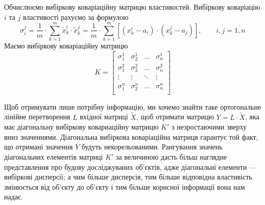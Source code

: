 Обчислюємо вибіркову коваріаційну матрицю властивостей.
Вибіркову коваріацію $i$ та $j$ властивості рахуємо за формулою
\begin{equation*}
  \sigma_i^j
  = \frac{1}{m} \cdot \sum_{k=1}^{m} \tilde{x}_k^i \cdot \tilde{x}_k^j
  = \frac{1}{m} \cdot \sum_{k=1}^{m}
    \left[ \left( x_k^i - a_i \right) \cdot \left( x_k^j - a_j \right) \right],
    \qquad i,j = \overline{1,n}
\end{equation*}
Маємо вибіркову коваріаційну матрицю
\begin{equation*}
  K = \begin{bmatrix}
    \sigma_1^1 & \sigma_2^1 & \dots  & \sigma_n^1 \\
    \sigma_1^2 & \sigma_2^2 & \dots  & \sigma_n^2 \\
    \vdots     & \vdots     & \ddots & \vdots     \\
    \sigma_1^n & \sigma_2^n & \dots  & \sigma_n^n \\
  \end{bmatrix}
\end{equation*}
\begin{comment}
\begin{equation*}
  K =
  \begin{bmatrix}
    \frac{1}{m} \cdot \sum_{k=1}^{m} \tilde{x}_k^1 \cdot \tilde{x}_k^1
    &
    \frac{1}{m} \cdot \sum_{k=1}^{m} \tilde{x}_k^1 \cdot \tilde{x}_k^2
    &
    \dots
    &
    \frac{1}{m} \cdot \sum_{k=1}^{m} \tilde{x}_k^1 \cdot \tilde{x}_k^n
    \\
    \frac{1}{m} \cdot \sum_{k=1}^{m} \tilde{x}_k^2 \cdot \tilde{x}_k^1
    &
    \frac{1}{m} \cdot \sum_{k=1}^{m} \tilde{x}_k^2 \cdot \tilde{x}_k^2
    &
    \dots
    &
    \frac{1}{m} \cdot \sum_{k=1}^{m} \tilde{x}_k^2 \cdot \tilde{x}_k^n
    \\
    \vdots & \vdots & \dots & \vdots \\
    \frac{1}{m} \cdot \sum_{k=1}^{m} \tilde{x}_k^n \cdot \tilde{x}_k^1
    &
    \frac{1}{m} \cdot \sum_{k=1}^{m} \tilde{x}_k^n \cdot \tilde{x}_k^2
    &
    \dots
    &
    \frac{1}{m} \cdot \sum_{k=1}^{m} \tilde{x}_k^n \cdot \tilde{x}_k^n
  \end{bmatrix}
\end{equation*}
\end{comment}

Щоб отримувати лише потрібну інформацію, ми хочемо знайти таке ортогональне
лінійне перетворення $L$ вхідної матриці $\tilde{X}$, щоб отримати матрицю
$Y = L \cdot \tilde{X}$, яка має діагональну вибіркову ковариаційну матрицю $K'$
з незростаючими зверху вниз значеннями.
Діагональна вибіркова коваріаційна матриця гарантує той факт, що отримані
значення $Y$ будуть некорельованими.
Рангування значень діагональних елементів матриці $K'$ за величиною дасть більш
наглядне представлення про будову досліджуваних об’єктів, адже діагональні
елементи --- вибіркові дисперсії; а чим більше дисперсія, тим більше відповідна
властивість змінюється від об’єкту до об’єкту і тим більше корисної інформації
вона нам надає.


